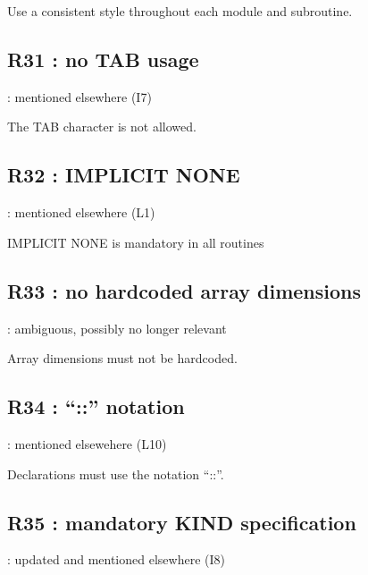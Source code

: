 \documentclass[letterpaper,10pt,english]{sphinxmanual}
\begin{document}
\sphinxAtStartPar
Use a consistent style throughout each module and subroutine.

\sphinxstepscope


\subsection{R31 :  no TAB usage}
\label{\detokenize{obsolescent/r31:r31-no-tab-usage}}\label{\detokenize{obsolescent/r31::doc}}
\sphinxAtStartPar
{} : mentioned elsewhere (I7)

\sphinxAtStartPar
The TAB character is not allowed.

\sphinxstepscope


\subsection{R32 : IMPLICIT NONE}
\label{\detokenize{obsolescent/r32:r32-implicit-none}}\label{\detokenize{obsolescent/r32::doc}}
\sphinxAtStartPar
{} : mentioned elsewhere (L1)

\sphinxAtStartPar
IMPLICIT NONE is mandatory in all routines

\sphinxstepscope


\subsection{R33 : no hard\sphinxhyphen{}coded array dimensions}
\label{\detokenize{obsolescent/r33:r33-no-hard-coded-array-dimensions}}\label{\detokenize{obsolescent/r33::doc}}
\sphinxAtStartPar
{} : ambiguous, possibly no longer relevant

\sphinxAtStartPar
Array dimensions must not be hard\sphinxhyphen{}coded.

\sphinxstepscope


\subsection{R34 : “::” notation}
\label{\detokenize{obsolescent/r34:r34-notation}}\label{\detokenize{obsolescent/r34::doc}}
\sphinxAtStartPar
{} : mentioned elsewehere (L10)

\sphinxAtStartPar
Declarations must use the notation “::”.

\sphinxstepscope


\subsection{R35 : mandatory KIND specification}
\label{\detokenize{obsolescent/r35:r35-mandatory-kind-specification}}\label{\detokenize{obsolescent/r35::doc}}
\sphinxAtStartPar
{} : updated and mentioned elsewhere (I8)
\end{document}
